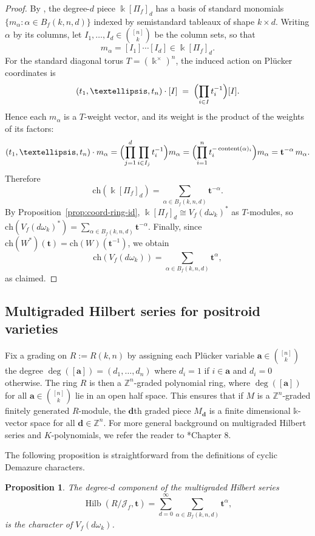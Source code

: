 \documentclass[12pt,reqno]{amsart}
\newtheorem{prop}[lemma]{Proposition}
\theoremstyle{definition}
\renewcommand{\aa}{\mathbf a}
\newcommand{\cJ}{\mathcal{J}}
\newcommand{\ZZ}{\mathbb{Z}}
\def\ZZ{{\mathbb Z}}
\newcommand{\ch}{\mathrm{ch}}
\newcommand{\content}{\operatorname{content}}
\newcommand{\hilb}{\operatorname{Hilb}}
\begin{document}
{\begin{proof}
By , the degree-$d$ piece $\Bbbk[\Pi_f]_d$ has a basis of standard monomials
$\{m_\alpha : \alpha\in B_f(k,n,d)\}$ indexed by semistandard tableaux of shape
$k\times d$.  Writing $\alpha$ by its columns, let $I_1,\dots,I_d\in\binom{[n]}{k}$
be the column sets, so that
\[
m_\alpha = [I_1]\cdots[I_d]\in \Bbbk[\Pi_f]_d.
\]
For the standard diagonal torus $T=(\Bbbk^\times)^n$, the induced action on Pl\"ucker
coordinates is
\[
(t_1,\dots,t_n)\cdot [I] \;=\;\Bigl(\prod_{i\in I} t_i^{-1}\Bigr)[I].
\]
Hence each $m_\alpha$ is a $T$-weight vector, and its weight is the product of the
weights of its factors:
\[
(t_1,\dots,t_n)\cdot m_\alpha
= \Bigl(\prod_{j=1}^d\prod_{i\in I_j} t_i^{-1}\Bigr)m_\alpha
= \Bigl(\prod_{i=1}^n t_i^{-\content(\alpha)_i}\Bigr)m_\alpha
= \mathbf t^{-\alpha}\, m_\alpha.
\]
Therefore
\[
\ch(\Bbbk[\Pi_f]_d)=\sum_{\alpha\in B_f(k,n,d)} \mathbf t^{-\alpha}.
\]
By Proposition~\ref{prop:coord-ring-id}, $\Bbbk[\Pi_f]_d\cong V_f(d\omega_k)^*$ as
$T$-modules, so $\ch(V_f(d\omega_k)^*)=\sum_{\alpha\in B_f(k,n,d)} \mathbf t^{-\alpha}$.
Finally, since $\ch(W^*)(\mathbf t)=\ch(W)(\mathbf t^{-1})$, we obtain
\[
\ch(V_f(d\omega_k))=\sum_{\alpha\in B_f(k,n,d)} \mathbf t^{\alpha},
\]
as claimed.
\end{proof}


\subsection{Multigraded Hilbert series for positroid varieties}
\label{subsec:hilbert-series-positroid}
Fix a grading on $R:=R(k,n)$ by assigning each Pl\"ucker variable $\aa\in\binom{[n]}{k}$ the degree $\deg ([\aa])=(d_1,\dots, d_n)$ where $d_i=1$ if $i\in\aa$ and $d_i=0$ otherwise. The ring $R$ is then a $\ZZ^n$-graded polynomial ring, where $\deg([\aa])$ for all $\aa\in\binom{[n]}{k}$ lie in an open half space. This ensures that if $M$ is a $\ZZ^n$-graded finitely generated $R$-module, the $\mathbf{d}$th graded piece $M_\mathbf{d}$ is a finite dimensional $\mathbb{k}$-vector space for all $\mathbf{d}\in \ZZ^n$. For more general background on multigraded Hilbert series and $K$-polynomials, we refer the reader to \cite{miller2005combinatorial}*{Chapter 8}. 


The following proposition is straightforward from the definitions of cyclic Demazure characters.
\begin{prop}
The degree-$d$ component of the multigraded Hilbert series 
\begin{equation}
    \hilb(R/\cJ_f, \mathbf{t})=\sum_{d=0}^\infty \sum_{\alpha \in B_f(k,n,d)}\mathbf{t}^\alpha,
\end{equation}
is the character of $V_f(d\omega_k)$. 
\end{prop}
 
}
\end{document}
